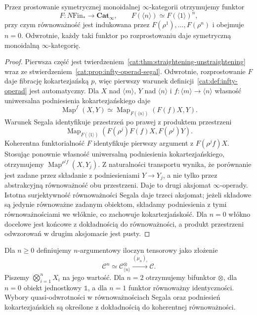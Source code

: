 \begin{twierdzenie}\label{cat:thm:infty-symmetric-segal}
Przez prostowanie symetrycznej monoidalnej $\infty$-kategorii otrzymujemy funktor
\[
 F:N\mathrm{Fin}_*\longrightarrow\mathbf{Cat}_{\infty},
 \qquad F(\langle n\rangle)\simeq F(\langle1\rangle)^n,
\]
przy czym równoważność jest indukowana przez $F(\rho^1),\ldots,F(\rho^n)$ i obejmuje $n=0$. Odwrotnie, każdy taki funktor po rozprostowaniu daje symetryczną monoidalną $\infty$-kategorię.
\end{twierdzenie}
\begin{proof}
Pierwsza część jest twierdzeniem~\ref{cat:thm:straightening-unstraightening} wraz ze stwierdzeniem~\ref{cat:prop:infty-operad-segal}. Odwrotnie, rozprostowanie $F$ daje fibrację kokartezjańską $p$, więc pierwszy warunek definicji~\ref{cat:def:infty-operad} jest automatyczny. Dla $X$ nad $\langle m\rangle$, $Y$ nad $\langle n\rangle$ i $f:\langle m\rangle\to\langle n\rangle$ własność uniwersalna podniesienia kokartezjańskiego daje
\[
 \operatorname{Map}^{f}(X,Y)
 \simeq \operatorname{Map}_{F(\langle n\rangle)}(F(f)X,Y).
\]
Warunek Segala identyfikuje przestrzeń po prawej z produktem przestrzeni
\[
 \operatorname{Map}_{F(\langle1\rangle)}
   (F(\rho^j)F(f)X,F(\rho^j)Y).
\]
Koherentna funktorialność $F$ identyfikuje pierwszy argument z $F(\rho^j f)X$. Stosując ponownie własność uniwersalną podniesienia kokartezjańskiego, otrzymujemy $\operatorname{Map}^{\rho^j f}(X,Y_j)$. Z naturalności transportu wynika, że porównanie jest zadane przez składanie z podniesieniami $Y\to Y_j$, a nie tylko przez abstrakcyjną równoważność obu przestrzeni. Daje to drugi aksjomat $\infty$-operady. Istotna surjektywność równoważności Segala daje trzeci aksjomat; jeżeli składowe są jedynie równoważne zadanym obiektom, składamy podniesienia z tymi równoważnościami we włóknie, co zachowuje kokartezjańskość. Dla $n=0$ włókno docelowe jest końcowe z dokładnością do równoważności, a produkt przestrzeni odwzorowań w drugim aksjomacie jest pusty.
\end{proof}

\begin{definicja}\label{cat:def:infty-monoidal-tensor}
Dla $n\geq0$ definiujemy $n$-argumentowy iloczyn tensorowy jako złożenie
\[
 \mathcal C^n \simeq \mathcal C^\otimes_{\langle n\rangle}
 \xrightarrow{(\mu_n)_!}\mathcal C.
\]
Piszemy $\bigotimes_{i=1}^n X_i$ na jego wartość. Dla $n=2$ otrzymujemy bifunktor $\otimes$, dla $n=0$ obiekt jednostkowy $\mathbb 1$, a dla $n=1$ funktor równoważny identyczności. Wybory quasi-odwrotności w równoważnościach Segala oraz podniesień kokartezjańskich są określone z dokładnością do koherentnej równoważności.
\end{definicja}


